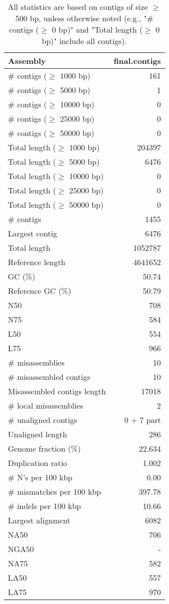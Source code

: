 \documentclass[12pt,a4paper]{article}
\begin{document}
\begin{table}[ht]
\begin{center}
\caption{All statistics are based on contigs of size $\geq$ 500 bp, unless otherwise noted (e.g., "\# contigs ($\geq$ 0 bp)" and "Total length ($\geq$ 0 bp)" include all contigs).}
\begin{tabular}{|l*{1}{|r}|}
\hline
Assembly & final.contigs \\ \hline
\# contigs ($\geq$ 1000 bp) & 161 \\ \hline
\# contigs ($\geq$ 5000 bp) & 1 \\ \hline
\# contigs ($\geq$ 10000 bp) & 0 \\ \hline
\# contigs ($\geq$ 25000 bp) & 0 \\ \hline
\# contigs ($\geq$ 50000 bp) & 0 \\ \hline
Total length ($\geq$ 1000 bp) & 204397 \\ \hline
Total length ($\geq$ 5000 bp) & 6476 \\ \hline
Total length ($\geq$ 10000 bp) & 0 \\ \hline
Total length ($\geq$ 25000 bp) & 0 \\ \hline
Total length ($\geq$ 50000 bp) & 0 \\ \hline
\# contigs & 1455 \\ \hline
Largest contig & 6476 \\ \hline
Total length & 1052787 \\ \hline
Reference length & 4641652 \\ \hline
GC (\%) & 50.74 \\ \hline
Reference GC (\%) & 50.79 \\ \hline
N50 & 708 \\ \hline
N75 & 584 \\ \hline
L50 & 554 \\ \hline
L75 & 966 \\ \hline
\# misassemblies & 10 \\ \hline
\# misassembled contigs & 10 \\ \hline
Misassembled contigs length & 17018 \\ \hline
\# local misassemblies & 2 \\ \hline
\# unaligned contigs & 0 + 7 part \\ \hline
Unaligned length & 286 \\ \hline
Genome fraction (\%) & 22.634 \\ \hline
Duplication ratio & 1.002 \\ \hline
\# N's per 100 kbp & 0.00 \\ \hline
\# mismatches per 100 kbp & 397.78 \\ \hline
\# indels per 100 kbp & 10.66 \\ \hline
Largest alignment & 6082 \\ \hline
NA50 & 706 \\ \hline
NGA50 & - \\ \hline
NA75 & 582 \\ \hline
LA50 & 557 \\ \hline
LA75 & 970 \\ \hline
\end{tabular}
\end{center}
\end{table}
\end{document}
